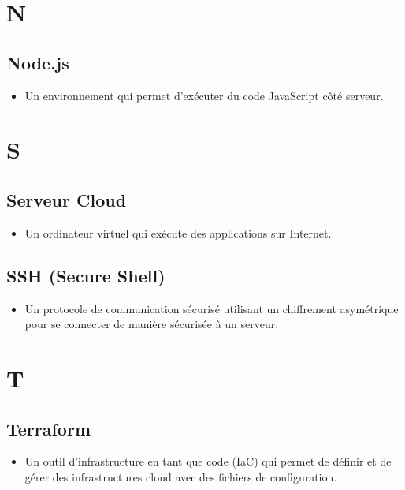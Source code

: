 \begin{multicols}{2}
    \section*{N}

    \subsection*{Node.js}
    \begin{itemize}
        \item Un environnement qui permet d'exécuter du code JavaScript côté serveur.
    \end{itemize}

    \section*{S}

    \subsection*{Serveur Cloud}
    \begin{itemize}
        \item Un ordinateur virtuel qui exécute des applications sur Internet.
    \end{itemize}

    \subsection*{SSH (Secure Shell)}
    \begin{itemize}
        \item Un protocole de communication sécurisé utilisant un chiffrement asymétrique pour se connecter de manière sécurisée à un serveur.
    \end{itemize}

    \section*{T}

    \subsection*{Terraform}
    \begin{itemize}
        \item Un outil d'infrastructure en tant que code (IaC) qui permet de définir et de gérer des infrastructures cloud avec des fichiers de configuration.
    \end{itemize}


\end{multicols}
